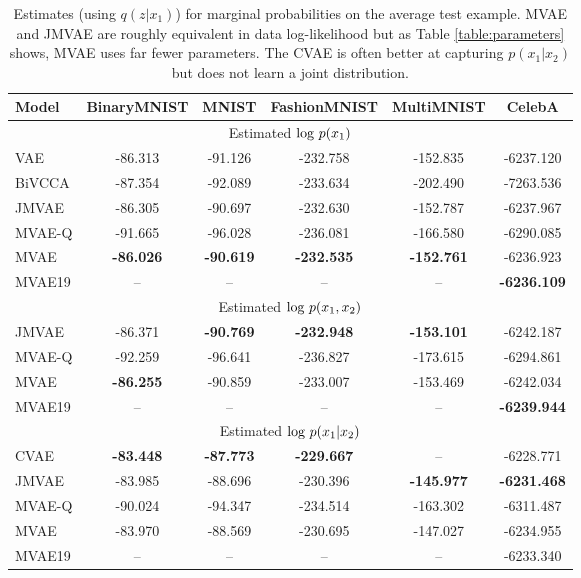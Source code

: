 \begin{table}[tb]
\centering
\small
\begin{tabular}{ l|c|c|c|c|c }
    \toprule
    Model & BinaryMNIST & MNIST & FashionMNIST & MultiMNIST & CelebA \\
    \hline
    \multicolumn{6}{c}{Estimated $\textup{log }p(x_{1})$} \\
    \hline
    VAE & -86.313 & -91.126 & -232.758 & -152.835 & -6237.120 \\
    BiVCCA & -87.354 & -92.089 & -233.634 & -202.490 & -7263.536 \\
    JMVAE & -86.305 & -90.697 & -232.630 & -152.787 & -6237.967 \\
    MVAE-Q & -91.665 & -96.028 & -236.081 & -166.580 & -6290.085 \\
    MVAE & \textbf{-86.026} & \textbf{-90.619} & \textbf{-232.535} & \textbf{-152.761} & -6236.923 \\
    MVAE19 & -- & -- & -- & -- & \textbf{-6236.109} \\
    \hline
    \multicolumn{6}{c}{Estimated $\textup{log }p(x_{1},x_{2})$} \\
    \hline
    JMVAE & -86.371 & \textbf{-90.769} & \textbf{-232.948} & \textbf{-153.101} & -6242.187 \\
    MVAE-Q & -92.259 & -96.641 & -236.827 & -173.615 & -6294.861 \\
    MVAE & \textbf{-86.255} & -90.859 & -233.007 & -153.469 & -6242.034 \\
    MVAE19 & -- & -- & -- & -- & \textbf{-6239.944} \\
    \hline
    \multicolumn{6}{c}{Estimated $\textup{log }p(x_{1}|x_{2})$} \\
    \hline
    CVAE & \textbf{-83.448} & \textbf{-87.773} & \textbf{-229.667} & -- & -6228.771 \\
    JMVAE & -83.985 & -88.696 & -230.396 & \textbf{-145.977} & \textbf{-6231.468} \\
    MVAE-Q & -90.024 & -94.347 & -234.514 & -163.302 & -6311.487 \\
    MVAE & -83.970 & -88.569 & -230.695 & -147.027 & -6234.955 \\
    MVAE19 & -- & -- & -- & -- & -6233.340 \\
    \bottomrule
\end{tabular}
\caption{Estimates (using $q(z|x_{1})$) for marginal probabilities on the average test example. MVAE and JMVAE are roughly equivalent in data log-likelihood but as Table \ref{table:parameters} shows, MVAE uses far fewer parameters. The CVAE is often better at capturing $p(x_{1}|x_{2})$ but does not learn a joint distribution.}
\label{table:x_results}
\end{table}

